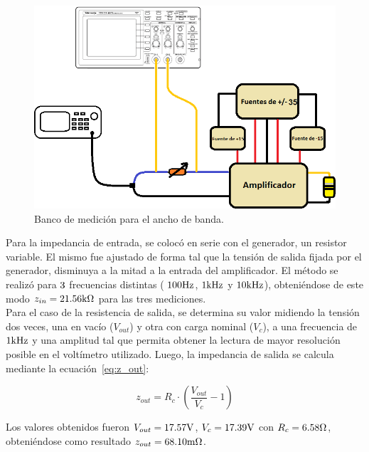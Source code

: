 \begin{figure}[H]
    \centering
    \includegraphics[width= 0.8 \textwidth]{./img/bancos/banco_Ri.png}
    \caption{Banco de medición para el ancho de banda.}
    \label{fig:banco_Ri}
\end{figure}







Para la impedancia de entrada, se colocó en serie con el generador, un resistor variable. El mismo fue ajustado de forma tal que la tensión de salida fijada por el generador, disminuya a la mitad a la entrada del amplificador. El método se realizó para $\num 3$ frecuencias distintas ( $100 \si[per-mode=symbol]{\hertz}$, $1 \si[per-mode=symbol]{\kilo\hertz}$ y  $10 \si[per-mode=symbol]{\kilo\hertz}$), obteniéndose de este modo $z_{in} = 21.56\si[per-mode=symbol]{\kilo\ohm}$ para las tres mediciones.\\

Para el caso de la resistencia de salida, se determina su valor midiendo la tensión dos veces, una en vacío ($V_{out}$) y otra con carga nominal ($V_c$), a una frecuencia de $1 \si[per-mode=symbol]{\kilo\hertz}$ y una amplitud tal que permita obtener la lectura de mayor resolución posible en el voltímetro utilizado. Luego, la impedancia de salida se calcula mediante la ecuación~\eqref{eq:z_out}:

\begin{equation}
    z_{out} = R_c \cdot \left( \frac{V_{out}}{V_c}-1 \right)
    \label{eq:z_out}
\end{equation}

Los valores obtenidos fueron $V_{out} = 17.57 \si[per-mode=symbol]{\volt}$, $V_c= 17.39 \si[per-mode=symbol]{\volt}$ con $R_c = 6.58\si[per-mode=symbol]{\ohm}$, obteniéndose como resultado $z_{out} = 68.10\si[per-mode=symbol]{\milli\ohm}$.\\

